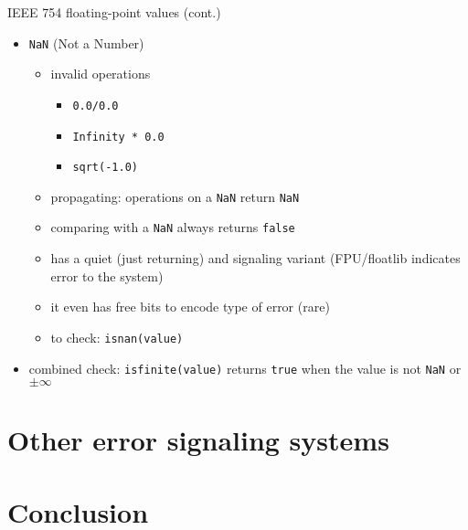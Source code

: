 \documentclass[aspectratio=169,14pt]{beamer}
\begin{document}
\begin{frame}{IEEE 754 floating-point values (cont.)}
\begin{itemize}
    \item \texttt{NaN} (Not a Number)
    \begin{itemize}
        \item invalid operations
        \begin{itemize}
            \item \texttt{0.0/0.0}
            \item \texttt{Infinity * 0.0}
            \item \texttt{sqrt(-1.0)}
        \end{itemize}
        \item propagating: operations on a \texttt{NaN} return \texttt{NaN}
        \item comparing with a \texttt{NaN} always returns \texttt{false}
        \item has a quiet (just returning) and signaling variant (FPU/floatlib indicates error to the system)
        \item it even has free bits to encode type of error (rare)
        \item to check: \texttt{isnan(value)}
    \end{itemize}
    \item combined check: \texttt{isfinite(value)} returns \texttt{true} when the value is not \texttt{NaN} or \( \pm \infty \)
\end{itemize}
\end{frame}



\section{Other error signaling systems}

\section{Conclusion}
\end{document}
